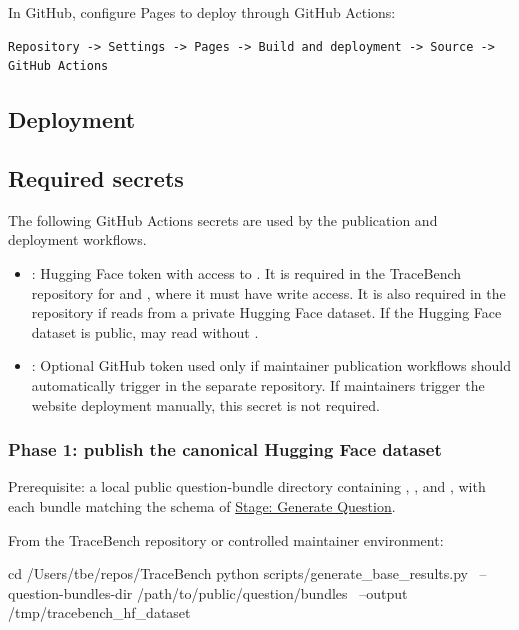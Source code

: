 \documentclass[11pt]{article}
\begin{document}
In GitHub, configure Pages to deploy through GitHub Actions:

\begin{verbatim}
Repository -> Settings -> Pages -> Build and deployment -> Source -> GitHub Actions
\end{verbatim}




\subsection*{Deployment}
\label{sec:website-deployment}


\subsection*{Required secrets}
  The following GitHub Actions secrets are used by the publication and deployment workflows.
  \begin{itemize}
    \item {}: Hugging Face token with access to .
    It is required in the TraceBench repository for  and , where it must have write access.
    It is also required in the  repository if  reads from a private Hugging Face dataset.
    If the Hugging Face dataset is public,  may read without .
    \item {}: Optional GitHub token used only if maintainer publication workflows should automatically trigger  in the separate  repository.
    If maintainers trigger the website deployment manually, this secret is not required.
  \end{itemize}

\subsubsection*{Phase 1: publish the canonical Hugging Face dataset}
Prerequisite: a local public question-bundle directory containing , , and , with each bundle matching the schema of \hyperref[docstart:generate_question_stage]{Stage: Generate Question}.

From the TraceBench repository or controlled maintainer environment:
\begin{DocCode}
cd /Users/tbe/repos/TraceBench
python scripts/generate_base_results.py \
    --question-bundles-dir /path/to/public/question/bundles \
    --output /tmp/tracebench_hf_dataset
\end{DocCode}
\end{document}
